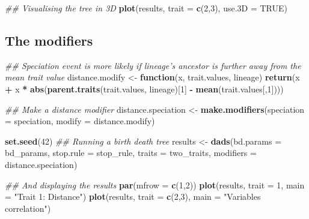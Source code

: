 \documentclass[]{book}
\newenvironment{Shaded}{\begin{snugshade}}{\end{snugshade}}
\newcommand{\CommentTok}[1]{\textcolor[rgb]{0.56,0.35,0.01}{\textit{#1}}}
\newcommand{\ControlFlowTok}[1]{\textcolor[rgb]{0.13,0.29,0.53}{\textbf{#1}}}
\newcommand{\DataTypeTok}[1]{\textcolor[rgb]{0.13,0.29,0.53}{#1}}
\newcommand{\DecValTok}[1]{\textcolor[rgb]{0.00,0.00,0.81}{#1}}
\newcommand{\KeywordTok}[1]{\textcolor[rgb]{0.13,0.29,0.53}{\textbf{#1}}}
\newcommand{\NormalTok}[1]{#1}
\newcommand{\OperatorTok}[1]{\textcolor[rgb]{0.81,0.36,0.00}{\textbf{#1}}}
\newcommand{\OtherTok}[1]{\textcolor[rgb]{0.56,0.35,0.01}{#1}}
\newcommand{\StringTok}[1]{\textcolor[rgb]{0.31,0.60,0.02}{#1}}
\begin{document}
\begin{Shaded}
\begin{Highlighting}[]
\CommentTok{## Visualising the tree in 3D}
\KeywordTok{plot}\NormalTok{(results, }\DataTypeTok{trait =} \KeywordTok{c}\NormalTok{(}\DecValTok{2}\NormalTok{,}\DecValTok{3}\NormalTok{), }\DataTypeTok{use.3D =} \OtherTok{TRUE}\NormalTok{)}
\end{Highlighting}
\end{Shaded}

\hypertarget{the-modifiers}{%
\subsection{The modifiers}\label{the-modifiers}}

\begin{Shaded}
\begin{Highlighting}[]
\CommentTok{## Speciation event is more likely if lineage's ancestor is further away from the mean trait value}
\NormalTok{distance.modify <-}\StringTok{ }\ControlFlowTok{function}\NormalTok{(x, trait.values, lineage) }\KeywordTok{return}\NormalTok{(x }\OperatorTok{+}\StringTok{ }\NormalTok{x }\OperatorTok{*}\StringTok{ }\KeywordTok{abs}\NormalTok{(}\KeywordTok{parent.traits}\NormalTok{(trait.values, lineage)[}\DecValTok{1}\NormalTok{] }\OperatorTok{-}\StringTok{ }\KeywordTok{mean}\NormalTok{(trait.values[,}\DecValTok{1}\NormalTok{])))}

\CommentTok{## Make a distance modifier}
\NormalTok{distance.speciation <-}\StringTok{ }\KeywordTok{make.modifiers}\NormalTok{(}\DataTypeTok{speciation =}\NormalTok{ speciation,}
                                      \DataTypeTok{modify =}\NormalTok{ distance.modify)}
\end{Highlighting}
\end{Shaded}

\begin{Shaded}
\begin{Highlighting}[]
\KeywordTok{set.seed}\NormalTok{(}\DecValTok{42}\NormalTok{)}
\CommentTok{## Running a birth death tree }
\NormalTok{results <-}\StringTok{ }\KeywordTok{dads}\NormalTok{(}\DataTypeTok{bd.params  =}\NormalTok{ bd_params,}
                \DataTypeTok{stop.rule  =}\NormalTok{ stop_rule,}
                \DataTypeTok{traits     =}\NormalTok{ two_traits,}
                \DataTypeTok{modifiers  =}\NormalTok{ distance.speciation)}

\CommentTok{## And displaying the results}
\KeywordTok{par}\NormalTok{(}\DataTypeTok{mfrow =} \KeywordTok{c}\NormalTok{(}\DecValTok{1}\NormalTok{,}\DecValTok{2}\NormalTok{))}
\KeywordTok{plot}\NormalTok{(results, }\DataTypeTok{trait =} \DecValTok{1}\NormalTok{, }\DataTypeTok{main =} \StringTok{"Trait 1: Distance"}\NormalTok{)}
\KeywordTok{plot}\NormalTok{(results, }\DataTypeTok{trait =} \KeywordTok{c}\NormalTok{(}\DecValTok{2}\NormalTok{,}\DecValTok{3}\NormalTok{), }\DataTypeTok{main =} \StringTok{"Variables correlation"}\NormalTok{)}
\end{Highlighting}
\end{Shaded}
\end{document}

